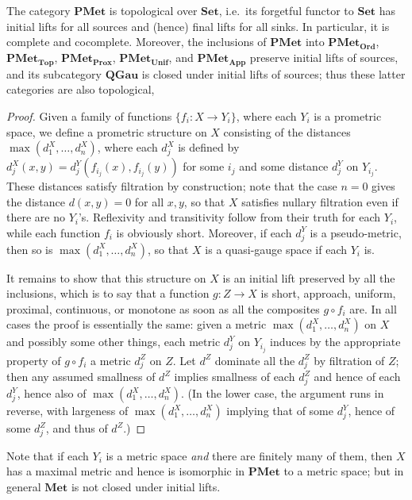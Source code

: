 \documentclass{article}
\def\Set{\mathbf{Set}}
\def\PMet{\mathbf{PMet}}
\def\QGau{\mathbf{QGau}}
\def\Met{\mathbf{Met}}
\def\PMetTop{\mathbf{PMet}_{\mathbf{Top}}}
\def\PMetUnif{\mathbf{PMet}_{\mathbf{Unif}}}
\def\PMetProx{\mathbf{PMet}_{\mathbf{Prox}}}
\def\PMetApp{\mathbf{PMet}_{\mathbf{App}}}
\def\PMetOrd{\mathbf{PMet}_{\mathbf{Ord}}}
\begin{document}
\begin{thm}
  The category $\PMet$ is topological over $\Set$, i.e.\ its forgetful functor to $\Set$ has initial lifts for all sources and (hence) final lifts for all sinks.
  In particular, it is complete and cocomplete.
  Moreover, the inclusions of $\PMet$ into $\PMetOrd$, $\PMetTop$, $\PMetProx$, $\PMetUnif$, and $\PMetApp$ preserve initial lifts of sources, and its subcategory $\QGau$ is closed under initial lifts of sources; thus these latter categories are also topological,
\end{thm}
\begin{proof}
  Given a family of functions $\{f_i : X \to Y_i\}$, where each $Y_i$ is a prometric space, we define a prometric structure on $X$ consisting of the distances $\max(d^X_1,\dots,d^X_n)$, where each $d^X_j$ is defined by $d^X_j(x,y) = d_j^Y(f_{i_j}(x),f_{i_j}(y))$ for some $i_j$ and some distance $d_j^Y$ on $Y_{i_j}$.
  These distances satisfy filtration by construction; note that the case $n=0$ gives the distance $d(x,y)=0$ for all $x,y$, so that $X$ satisfies nullary filtration even if there are no $Y_i$'s.
  Reflexivity and transitivity follow from their truth for each $Y_i$, while each function $f_i$ is obviously short.
  Moreover, if each $d_j^Y$ is a pseudo-metric, then so is $\max(d^X_1,\dots,d^X_n)$, so that $X$ is a quasi-gauge space if each $Y_i$ is.

  It remains to show that this structure on $X$ is an initial lift preserved by all the inclusions, which is to say that a function $g:Z\to X$ is short, approach, uniform, proximal, continuous, or monotone as soon as all the composites $g\circ f_i$ are.
  In all cases the proof is essentially the same: given a metric $\max(d^X_1,\dots,d^X_n)$ on $X$ and possibly some other things, each metric $d_j^Y$ on $Y_{i_j}$ induces by the appropriate property of $g\circ f_i$ a metric $d^Z_j$ on $Z$.
  Let $d^Z$ dominate all the $d^Z_j$ by filtration of $Z$; then any assumed smallness of $d^Z$ implies smallness of each $d^Z_j$ and hence of each $d_j^Y$, hence also of $\max(d^X_1,\dots,d^X_n)$.
  (In the lower case, the argument runs in reverse, with largeness of $\max(d^X_1,\dots,d^X_n)$ implying that of some $d_j^Y$, hence of some $d^Z_j$, and thus of $d^Z$.)
\end{proof}

Note that if each $Y_i$ is a metric space \emph{and} there are finitely many of them, then $X$ has a maximal metric and hence is isomorphic in $\PMet$ to a metric space; but in general $\Met$ is not closed under initial lifts.
\end{document}
